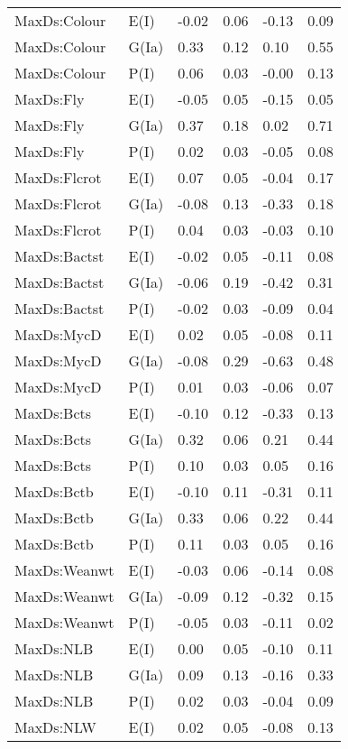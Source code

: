 \begin{center}
\begin{longtable}{|p{1.1in}|p{0.7in}|p{0.7in}|p{0.6in}|p{0.6in}|p{0.6in}|}
  MaxDs:Colour & E(I) & -0.02 & 0.06 & -0.13 & 0.09 \\ 
  MaxDs:Colour & G(Ia) & 0.33 & 0.12 & 0.10 & 0.55 \\ 
  MaxDs:Colour & P(I) & 0.06 & 0.03 & -0.00 & 0.13 \\ 
  MaxDs:Fly & E(I) & -0.05 & 0.05 & -0.15 & 0.05 \\ 
  MaxDs:Fly & G(Ia) & 0.37 & 0.18 & 0.02 & 0.71 \\ 
  MaxDs:Fly & P(I) & 0.02 & 0.03 & -0.05 & 0.08 \\ 
  MaxDs:Flcrot & E(I) & 0.07 & 0.05 & -0.04 & 0.17 \\ 
  MaxDs:Flcrot & G(Ia) & -0.08 & 0.13 & -0.33 & 0.18 \\ 
  MaxDs:Flcrot & P(I) & 0.04 & 0.03 & -0.03 & 0.10 \\ 
  MaxDs:Bactst & E(I) & -0.02 & 0.05 & -0.11 & 0.08 \\ 
  MaxDs:Bactst & G(Ia) & -0.06 & 0.19 & -0.42 & 0.31 \\ 
  MaxDs:Bactst & P(I) & -0.02 & 0.03 & -0.09 & 0.04 \\ 
  MaxDs:MycD & E(I) & 0.02 & 0.05 & -0.08 & 0.11 \\ 
  MaxDs:MycD & G(Ia) & -0.08 & 0.29 & -0.63 & 0.48 \\ 
  MaxDs:MycD & P(I) & 0.01 & 0.03 & -0.06 & 0.07 \\ 
  MaxDs:Bcts & E(I) & -0.10 & 0.12 & -0.33 & 0.13 \\ 
  MaxDs:Bcts & G(Ia) & 0.32 & 0.06 & 0.21 & 0.44 \\ 
  MaxDs:Bcts & P(I) & 0.10 & 0.03 & 0.05 & 0.16 \\ 
  MaxDs:Bctb & E(I) & -0.10 & 0.11 & -0.31 & 0.11 \\ 
  MaxDs:Bctb & G(Ia) & 0.33 & 0.06 & 0.22 & 0.44 \\ 
  MaxDs:Bctb & P(I) & 0.11 & 0.03 & 0.05 & 0.16 \\ 
  MaxDs:Weanwt & E(I) & -0.03 & 0.06 & -0.14 & 0.08 \\ 
  MaxDs:Weanwt & G(Ia) & -0.09 & 0.12 & -0.32 & 0.15 \\ 
  MaxDs:Weanwt & P(I) & -0.05 & 0.03 & -0.11 & 0.02 \\ 
  MaxDs:NLB & E(I) & 0.00 & 0.05 & -0.10 & 0.11 \\ 
  MaxDs:NLB & G(Ia) & 0.09 & 0.13 & -0.16 & 0.33 \\ 
  MaxDs:NLB & P(I) & 0.02 & 0.03 & -0.04 & 0.09 \\ 
  MaxDs:NLW & E(I) & 0.02 & 0.05 & -0.08 & 0.13 \\ 

\end{longtable}
\end{center}
